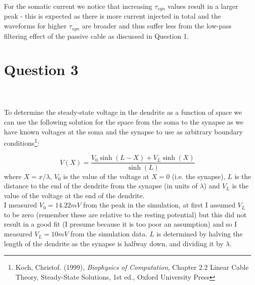 \documentclass[paper=a4, fontsize=11pt]{scrartcl} %
\numberwithin{equation}{section} %
\numberwithin{figure}{section} %
\numberwithin{table}{section} %
\begin{document}
For the somatic current we notice that increasing $\tau_{syn}$ values result in a larger peak - this is expected as there is more current injected in total and the waveforms for higher $\tau_{syn}$ are broader and thus suffer less from the low-pass filtering effect of the passive cable as discussed in Question 1.



\newpage
\section{\textbf{Question 3}}

\\
\\

To determine the steady-state voltage in the dendrite as a function of space we can use the following solution for the space from the soma to the synapse as we have known voltages at the soma and the synapse to use as arbitrary boundary conditions\footnote{Koch, Christof. (1999), \textit{Biophysics of Computation}, Chapter 2.2 Linear Cable Theory, Steady-State Solutions, 1st ed., Oxford University Press}:

\begin{equation}
V(X)= \frac{V_0 \sinh (L-X) + V_L \sinh (X) }{\sinh (L)}
\label{eq:koch}
\end{equation}
where $X=x/\lambda$, $V_0$ is the value of the voltage at $X=0$ (i.e. the synapse), $L$ is the distance to the end of the dendrite from the synapse (in units of $\lambda$) and $V_L$ is the value of the voltage at the end of the dendrite.\\

I measured $V_0 = 14.22 mV$ from the peak in the simulation, at first I assumed $V_L$  to be zero (remember these are relative to the resting potential) but this did not result in a good fit (I presume because it is too poor an assumption) and so I measured $V_L = 10mV$ from the simulation data. $L$ is determined by halving the length of the dendrite as the synapse is halfway down, and dividing it by $\lambda$.\\
\end{document}
